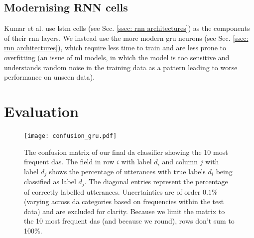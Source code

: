     \subsection{Modernising RNN cells}
    Kumar et al.\cite{kumar2017dialogue} use \gls{lstm} cells (see Sec. \ref{ssec: rnn architectures}) as the components of their \gls{rnn} layers. We instead use the more modern \gls{gru}\cite{chung2014empirical} \glspl{neuron} (see Sec. \ref{ssec: rnn architectures}), which require less time to train and are less prone to overfitting (an issue of \gls{ml} models, in which the \gls{model} is too sensitive and understands random noise in the training data as a pattern leading to worse performance on unseen data)\cite{chung2014empirical}.

    \section{Evaluation \label{ssec: method my da model evaluation}}
    
    \begin{figure}[t!]
        \centering
        \texttt{[image: confusion\_gru.pdf]}
        \caption{The confusion matrix of our final \gls{da} classifier showing the 10 most frequent \glspl{da}. The field in row $i$ with label $d_i$ and column $j$ with label $d_j$ shows the percentage of \glspl{utterance} with true labels $d_i$ being classified as label $d_j$. The diagonal entries represent the percentage of correctly labelled \glspl{utterance}. Uncertainties are of order $0.1\%$ (varying across \gls{da} categories based on frequencies within the test data) and are excluded for clarity. Because we limit the matrix to the 10 most frequent \glspl{da} (and because we round), rows don't sum to 100\%.}
        \label{fig:confusion}
    \end{figure}
    
